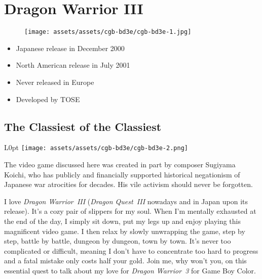 \documentclass{book}
\begin{document}
\begingroup \chapter*{Dragon Warrior III} \endgroup
\begin{figure}[H]
\vskip 4pt
\centering
\texttt{[image: assets/assets/cgb-bd3e/cgb-bd3e-1.jpg]}\end{figure}
\begin{itemize} [nosep]




\item Japanese release in December 2000







\item North American release in July 2001










\item Never released in Europe



\item Developed by TOSE

\end{itemize}\noindent

\newpage\FloatBarrier\needspace{10mm}\section*{The Classiest of the Classiest}\nopagebreak[4]
\begin{wrapfigure}{L}{0pt} \texttt{[image: assets/assets/cgb-bd3e/cgb-bd3e-2.png]}\end{wrapfigure}
The video game discussed here was created in part by composer Sugiyama Koichi, who has publicly and financially supported historical negationism of Japanese war atrocities for decades. His vile activism should never be forgotten.

I love \emph{Dragon Warrior III} (\emph{Dragon Quest III} nowadays and in Japan upon its release). It’s a cozy pair of slippers for my soul. When I’m mentally exhausted at the end of the day, I simply sit down, put my legs up and enjoy playing this magnificent video game. I then relax by slowly unwrapping the game, step by step, battle by battle, dungeon by dungeon, town by town. It’s never too complicated or difficult, meaning I don’t have to concentrate too hard to progress and a fatal mistake only costs half your gold. Join me, why won’t you, on this essential quest to talk about my love for \emph{Dragon Warrior 3} for Game Boy Color.
\end{document}
